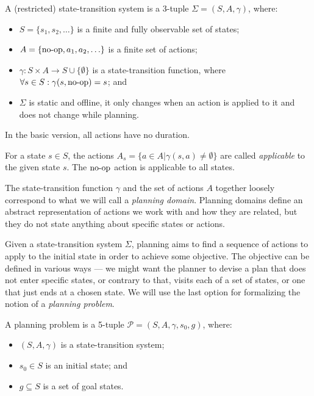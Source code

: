 \begin{defn}\label{defn:state-transition-sys}
A (restricted) state-transition system is a 3-tuple $\Sigma = (S, A, \gamma)$, where:
\begin{itemize}
\item $S = \{s_1, s_2, \ldots\}$ is a finite and fully observable set of states;
\item $A = \{\operatorname{\textrm{no-op}}, a_1, a_2, \ldots\}$ is a finite set of actions;
\item $\gamma: S \times A \to S \cup \{\emptyset\}$ is a state-transition function,
where $\forall s \in S : \gamma(s, \operatorname{\textrm{no-op}}) = s$; and
\item $\Sigma$ is static and offline,
it only changes when an action is applied to it and does not change while planning.
\end{itemize}
In the basic version, all actions have no duration.
\end{defn}

For a state $s \in S$, the actions $A_s = \{a \in A | \gamma(s, a) \neq \emptyset\}$ are called \textit{applicable}
to the given state $s$. The $\operatorname{\textrm{no-op}}$ action is applicable to all states.

The state-transition function $\gamma$ and the set of actions $A$ together loosely correspond to what we will call a \textit{planning domain}.
Planning domains define an abstract representation of actions we work with
and how they are related,
but they do not state anything about specific states or actions.

Given a state-transition system $\Sigma$, planning aims to find a
sequence of actions to apply to the initial state in order to achieve some objective.
The objective can be defined in various ways --- we might want the planner
to devise a plan that
does not enter specific states, or contrary to that, visits each of a set of states,
or one that just ends at a chosen state.
We will use the last option for formalizing the notion of a \textit{planning problem}.

\begin{defn}\label{defn:planning-problem}\citep[Part~I]{Ghallab2004}
A planning problem is a 5-tuple $\mathcal{P} = (S, A, \gamma, s_0, g)$, where:
\begin{itemize}
\item $(S, A, \gamma)$ is a state-transition system;
\item $s_0 \in S$ is an initial state; and
\item $g \subseteq S$ is a set of goal states.
\end{itemize}
\end{defn}

